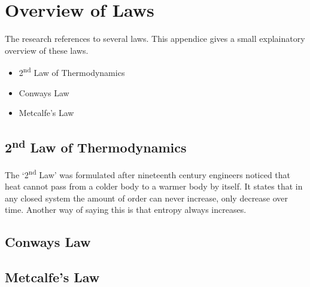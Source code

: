 \chapter{Overview of Laws}

The research references to several laws. This appendice gives a small explainatory overview of these laws.

\begin{itemize}
	\item{2\textsuperscript{nd} Law of Thermodynamics}
	\item{Conways Law}
	\item{Metcalfe's Law}
\end{itemize}

\section{2\textsuperscript{nd} Law of Thermodynamics}
\label{sec:appendix2ndlawthermodynamics}
The ‘2\textsuperscript{nd} Law’ was formulated after nineteenth century engineers noticed that heat cannot pass from a colder body to a warmer body by itself. It states that in any closed system the amount of order can never increase, only decrease over time. Another way of saying this is that entropy always increases.

\section{Conways Law}

\section{Metcalfe's Law}


